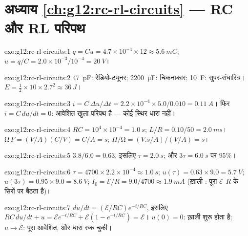 \section*{अध्याय \ref{ch:g12:rc-rl-circuits} --- RC और RL परिपथ}

\begin{solution}{exo:g12:rc-rl-circuits:1}
$q = Cu = 4.7\times10^{-4} \times 12 \approx \qty{5.6}{mC}$; $u = q/C = 2.0\times10^{-3}/10^{-4} = \qty{20}{V}$।
\end{solution}

\begin{solution}{exo:g12:rc-rl-circuits:2}
\qty{47}{pF}: रेडियो-ट्यूनर; \qty{2200}{\micro F}: चिकनाकार; \qty{10}{F}: सुपर-संधारित्र। $E = \tfrac12 \times 10 \times 2.7^2 \approx \qty{36}{J}$।
\end{solution}

\begin{solution}{exo:g12:rc-rl-circuits:3}
$i = C\,\Delta u/\Delta t = 2.2\times10^{-4} \times 5.0/0.010 =
\qty{0.11}{A}$। फिर $i = C\,du/dt = 0$: आवेशित  खुला परिपथ है --- कोई स्थिर धारा
नहीं।
\end{solution}

\begin{solution}{exo:g12:rc-rl-circuits:4}
$RC = 10^4 \times 10^{-4} = \qty{1.0}{s}$; $L/R = 0.10/50 = \qty{2.0}{ms}$। $\unit{\ohm}\,\unit{F} =
(\unit{V/A})(\unit{C/V}) = \unit{C/A} = \unit{s}$; $\unit{H}/\unit{\ohm} = (\unit{V.s/A})/(\unit{V/A}) = \unit{s}$।
\end{solution}

\begin{solution}{exo:g12:rc-rl-circuits:5}
$3.8/6.0 = 0.63$, इसलिए $\tau = \qty{2.0}{s}$; और $3\tau =
\qty{6.0}{s}$ पर $95\%$।
\end{solution}

\begin{solution}{exo:g12:rc-rl-circuits:6}
$\tau = 4700 \times 2.2\times10^{-4} \approx \qty{1.0}{s}$; $u(\tau) = 0.63 \times 9.0 = \qty{5.7}{V}$; $u(3\tau) = 0.95 \times 9.0 = \qty{8.6}{V}$; $I_0 = \mathcal{E}/R = 9.0/4700 \approx \qty{1.9}{mA}$ (ख़ाली : पूरा $\mathcal{E}$ $R$ के
सिरों पर बैठता है)।
\end{solution}

\begin{solution}{exo:g12:rc-rl-circuits:7}
$du/dt = (\mathcal{E}/RC)e^{-t/RC}$, इसलिए $RC\,du/dt + u =
\mathcal{E}e^{-t/RC} + \mathcal{E}(1 - e^{-t/RC}) = \mathcal{E}$। $u(0) = 0$:  ख़ाली शुरू होता है; $u \to \mathcal{E}$:
पूरा आवेशित, और धारा रुक चुकी।
\end{solution}

